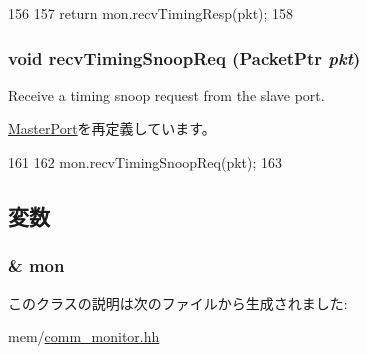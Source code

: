 \begin{DoxyCode}
156         {
157             return mon.recvTimingResp(pkt);
158         }
\end{DoxyCode}
\hypertarget{classCommMonitor_1_1MonitorMasterPort_aff3031c56fc4947a19695c868bb8233e}{
\subsubsection[{recvTimingSnoopReq}]{\setlength{\rightskip}{0pt plus 5cm}void recvTimingSnoopReq ({\bf PacketPtr} {\em pkt})}}
\label{classCommMonitor_1_1MonitorMasterPort_aff3031c56fc4947a19695c868bb8233e}
Receive a timing snoop request from the slave port. 

\hyperlink{classMasterPort_ae43c73eff109f907118829fcfa9e7096}{MasterPort}を再定義しています。


\begin{DoxyCode}
161         {
162             mon.recvTimingSnoopReq(pkt);
163         }
\end{DoxyCode}


\subsection{変数}
\hypertarget{classCommMonitor_1_1MonitorMasterPort_ab6833d8d55cb403502472c073464905b}{
\subsubsection[{mon}]{\& {\bf mon}}}
\label{classCommMonitor_1_1MonitorMasterPort_ab6833d8d55cb403502472c073464905b}


このクラスの説明は次のファイルから生成されました:\begin{DoxyCompactItemize}
\item 
mem/\hyperlink{comm__monitor_8hh}{comm\_\-monitor.hh}\end{DoxyCompactItemize}
